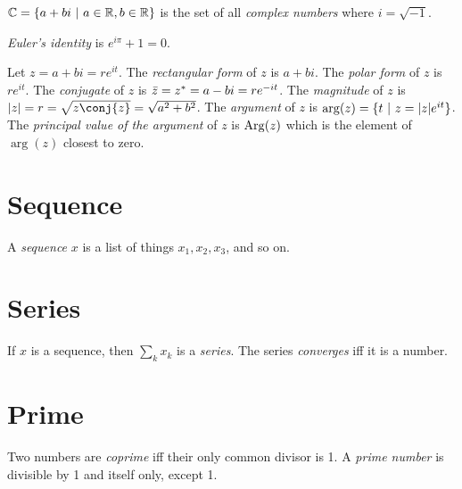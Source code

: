 \(\mathbb{C} = \{ a + bi ~|~ a \in \mathbb{R}, b \in \mathbb{R} \}\)
is the set of all \emph{complex numbers} where \(i = \sqrt{-1}\).

%
\emph{Euler's identity} is \( e^{i \pi} + 1 = 0 \).

Let \(z = a+bi = re^{it}\).
%
%
The \emph{rectangular form} of \(z\) is \(a+bi\).
%
%
The \emph{polar form} of \(z\) is \(re^{it}\).
%
%
%
The \emph{conjugate} of \(z\) is \(\bar{z} = z^* = a-bi = re^{-it}\).
%
%
%
The \emph{magnitude} of \(z\) is \(\abs{z} = r = \sqrt{z\conj{z}} = \sqrt{a^2+b^2}\).
%
%
%
The \emph{argument} of \(z\) is \(\arg(z) = \{ t ~|~ z = |z| e^{it} \}\).
%
%
%
The \emph{principal value of the argument} of \(z\) is \(\mathrm{Arg}(z)\)
which is the element of \(\arg(z)\) closest to zero.

\section{Sequence}

%
A \emph{sequence} \(x\) is a list of things \(x_1, x_2, x_3\), and so on.

\section{Series}

%
If \(x\) is a sequence, then \(\sum_k x_k\) is a \emph{series}.
The series \emph{converges} iff it is a number.

\section{Prime}

%
%
Two numbers are \emph{coprime} iff their only common divisor is 1.
%
%
A \emph{prime number} is divisible by 1 and itself only, except 1.

